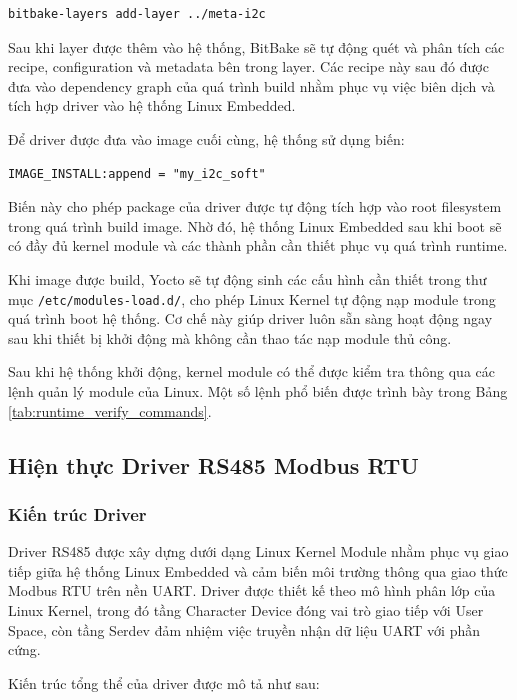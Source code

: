 \begin{verbatim}
bitbake-layers add-layer ../meta-i2c
\end{verbatim}

Sau khi layer được thêm vào hệ thống, BitBake sẽ tự động quét và phân tích các recipe, configuration và metadata bên trong layer. Các recipe này sau đó được đưa vào dependency graph của quá trình build nhằm phục vụ việc biên dịch và tích hợp driver vào hệ thống Linux Embedded.

Để driver được đưa vào image cuối cùng, hệ thống sử dụng biến:

\begin{verbatim}
IMAGE_INSTALL:append = "my_i2c_soft"
\end{verbatim}

Biến này cho phép package của driver được tự động tích hợp vào root filesystem trong quá trình build image. Nhờ đó, hệ thống Linux Embedded sau khi boot sẽ có đầy đủ kernel module và các thành phần cần thiết phục vụ quá trình runtime.

Khi image được build, Yocto sẽ tự động sinh các cấu hình cần thiết trong thư mục \texttt{/etc/modules-load.d/}, cho phép Linux Kernel tự động nạp module trong quá trình boot hệ thống. Cơ chế này giúp driver luôn sẵn sàng hoạt động ngay sau khi thiết bị khởi động mà không cần thao tác nạp module thủ công.

Sau khi hệ thống khởi động, kernel module có thể được kiểm tra thông qua các lệnh quản lý module của Linux. Một số lệnh phổ biến được trình bày trong Bảng \ref{tab:runtime_verify_commands}.


\subsection{Hiện thực Driver RS485 Modbus RTU}

\subsubsection{Kiến trúc Driver}

Driver RS485 được xây dựng dưới dạng Linux Kernel Module nhằm phục vụ giao tiếp giữa hệ thống Linux Embedded và cảm biến môi trường thông qua giao thức Modbus RTU trên nền UART. Driver được thiết kế theo mô hình phân lớp của Linux Kernel, trong đó tầng Character Device đóng vai trò giao tiếp với User Space, còn tầng Serdev đảm nhiệm việc truyền nhận dữ liệu UART với phần cứng.

Kiến trúc tổng thể của driver được mô tả như sau:

